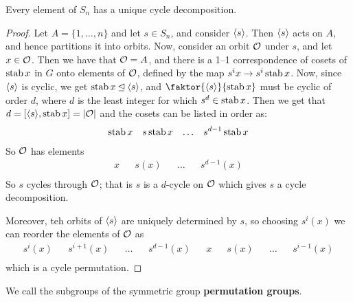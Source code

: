 \begin{theorem}\label{4.1.5}
    Every element of $S_n$ has a unique cycle decomposition.
\end{theorem}
\begin{proof}
    Let $A=\{1, \dots, n\}$ and let $s \in S_n$, and consider  $\langle s\rangle$.
    Then $\langle s\rangle$ acts on $A$, and hence partitions it into orbits. Now,
    consider an orbit  $\mathcal{O}$ under  $s$, and let  $x \in \mathcal{O}$. Then we have that
     $\mathcal{O}=A$, and there is a 1--1 correspondence of cosets of $\operatorname{stab}{x}$ in $G$
     onto elements of  $\mathcal{O}$, defined by the map  $s^ix \rightarrow
     s^i\operatorname{stab}{x}$. Now, since $\langle s\rangle$ is cyclic, we get $\operatorname{stab}{x} \unlhd
     \langle s\rangle$, and $\faktor{\vbrack{s}}{\stab{x}}$ must be cyclic of order
     $d$, where  $d$ is the least integer for which  $s^d \in \operatorname{stab}{x}$. Then we
     get that $d=[\langle s\rangle,\operatorname{stab}{x}]=|\mathcal{O}|$ and the cosets can be listed in
     order as:
     \begin{align*}
         \operatorname{stab}{x}   &&   s\operatorname{stab}{x}   &&   \dots   &&   s^{d-1}\operatorname{stab}{x} \\
     \end{align*}
     So $\mathcal{O}$ has elements
     \begin{align*}
         x      &&      s(x)    &&      \dots       &&      s^{d-1}(x)      \\
     \end{align*}
     So $s$ cycles through  $\mathcal{O}$; that is  $s$ is a  $d$-cycle on $\mathcal{O}$ which
     gives  $s$ a cycle decomposition.

     Moreover, teh orbits of  $\langle s\rangle$ are uniquely determined by $s$, so
     choosing  $s^i(x)$ we can reorder the elements of $\mathcal{O}$ as
     \begin{align*}
         s^i(x) && s^{i+1}(x) && \dots && s^{d-1}(x) && x && s(x) && \dots &&
         s^{i-1}(x) \\
     \end{align*}
     which is a cycle permutation.
\end{proof}

\begin{definition}
    We call the subgroups of the symmetric group \textbf{permutation groups}.
\end{definition}
